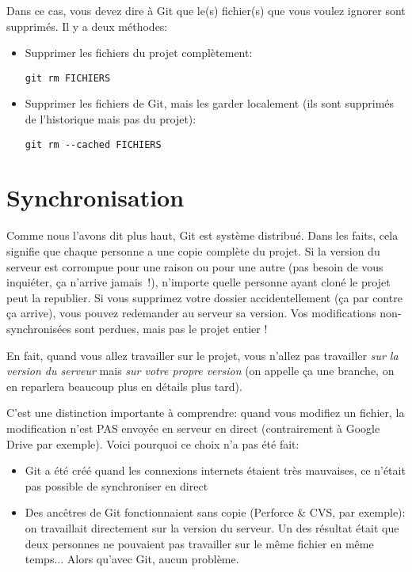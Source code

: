 \documentclass[10pt,a4paper]{article}
\begin{document}
Dans ce cas, vous devez dire à Git que le(s) fichier(s) que vous voulez ignorer sont supprimés. Il y a deux méthodes:

\begin{itemize}
\item Supprimer les fichiers du projet complètement:%

\begin{verbatim}
git rm FICHIERS
\end{verbatim}

\item Supprimer les fichiers de Git, mais les garder localement (ils sont supprimés de l'historique mais pas du projet):%

\begin{verbatim}
git rm --cached FICHIERS
\end{verbatim}
\end{itemize}

\section{Synchronisation}

Comme nous l'avons dit plus haut, Git est système distribué. Dans les faits, cela signifie que chaque personne a une copie complète du projet. Si la version du serveur est corrompue pour une raison ou pour une autre (pas besoin de vous inquiéter, ça n'arrive jamais~!), n'importe quelle personne ayant cloné le projet peut la republier. Si vous supprimez votre dossier accidentellement (ça par contre ça arrive), vous pouvez redemander au serveur sa version. Vos modifications non-synchronisées sont perdues, mais pas le projet entier !

En fait, quand vous allez travailler sur le projet, vous n'allez pas travailler \textit{sur la version du serveur} mais \textit{sur votre propre version} (on appelle ça une branche, on en reparlera beaucoup plus en détails plus tard).

C'est une distinction importante à comprendre: quand vous modifiez un fichier, la modification n'est PAS envoyée en serveur en direct (contrairement à Google Drive par exemple). Voici pourquoi ce choix n'a pas été fait:

\begin{itemize}
\item Git a été créé quand les connexions internets étaient très mauvaises, ce n'était pas possible de synchroniser en direct
\item Des ancêtres de Git fonctionnaient sans copie (Perforce \& CVS, par exemple): on travaillait directement sur la version du serveur. Un des résultat était que deux personnes ne pouvaient pas travailler sur le même fichier en même temps... Alors qu'avec Git, aucun problème.
\end{itemize}
\end{document}
